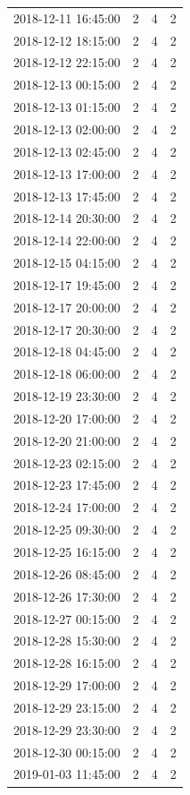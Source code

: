 \begin{tabular}{lrrr}
2018-12-11 16:45:00 & 2 & 4 & 2 \\
2018-12-12 18:15:00 & 2 & 4 & 2 \\
2018-12-12 22:15:00 & 2 & 4 & 2 \\
2018-12-13 00:15:00 & 2 & 4 & 2 \\
2018-12-13 01:15:00 & 2 & 4 & 2 \\
2018-12-13 02:00:00 & 2 & 4 & 2 \\
2018-12-13 02:45:00 & 2 & 4 & 2 \\
2018-12-13 17:00:00 & 2 & 4 & 2 \\
2018-12-13 17:45:00 & 2 & 4 & 2 \\
2018-12-14 20:30:00 & 2 & 4 & 2 \\
2018-12-14 22:00:00 & 2 & 4 & 2 \\
2018-12-15 04:15:00 & 2 & 4 & 2 \\
2018-12-17 19:45:00 & 2 & 4 & 2 \\
2018-12-17 20:00:00 & 2 & 4 & 2 \\
2018-12-17 20:30:00 & 2 & 4 & 2 \\
2018-12-18 04:45:00 & 2 & 4 & 2 \\
2018-12-18 06:00:00 & 2 & 4 & 2 \\
2018-12-19 23:30:00 & 2 & 4 & 2 \\
2018-12-20 17:00:00 & 2 & 4 & 2 \\
2018-12-20 21:00:00 & 2 & 4 & 2 \\
2018-12-23 02:15:00 & 2 & 4 & 2 \\
2018-12-23 17:45:00 & 2 & 4 & 2 \\
2018-12-24 17:00:00 & 2 & 4 & 2 \\
2018-12-25 09:30:00 & 2 & 4 & 2 \\
2018-12-25 16:15:00 & 2 & 4 & 2 \\
2018-12-26 08:45:00 & 2 & 4 & 2 \\
2018-12-26 17:30:00 & 2 & 4 & 2 \\
2018-12-27 00:15:00 & 2 & 4 & 2 \\
2018-12-28 15:30:00 & 2 & 4 & 2 \\
2018-12-28 16:15:00 & 2 & 4 & 2 \\
2018-12-29 17:00:00 & 2 & 4 & 2 \\
2018-12-29 23:15:00 & 2 & 4 & 2 \\
2018-12-29 23:30:00 & 2 & 4 & 2 \\
2018-12-30 00:15:00 & 2 & 4 & 2 \\
2019-01-03 11:45:00 & 2 & 4 & 2 \\

\end{tabular}

